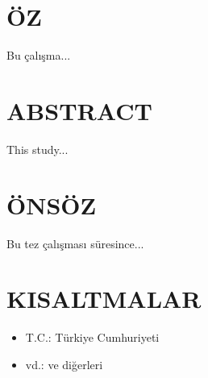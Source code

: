 
\chapterfont{}
\chapter*{\centering ÖZ}
Bu çalışma...

\chapter*{ABSTRACT}
This study...

\chapter*{ÖNSÖZ}
Bu tez çalışması süresince...
\newpage

\tableofcontents
\renewcommand{\cftchapfont}{\bfseries}
\renewcommand{\cftsecfont}{\bfseries}
\renewcommand{\cftsubsecfont}{\normalfont}
\renewcommand{\cftchappagefont}{\bfseries}
\renewcommand{\cftsecpagefont}{\bfseries}

\newpage
\listoffigures
\listoftables
\chapter*{KISALTMALAR}
\begin{itemize}
  \item T.C.: Türkiye Cumhuriyeti
  \item vd.: ve diğerleri
\end{itemize}
